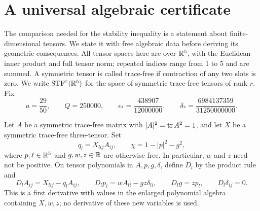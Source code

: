 \section{A universal algebraic certificate}\label{sec:certificate}\label{cert:section}

The comparison needed for the stability inequality is a statement about
finite-dimensional tensors. We state it with free algebraic data before
deriving its geometric consequences. All tensor spaces here are over $\mathbb R^5$,
with the Euclidean inner product and full tensor norm; repeated indices range
from $1$ to $5$ and are summed.  A symmetric tensor is called trace-free if
contraction of any two
slots is zero.  We write $\operatorname{STF}^r(\mathbb R^5)$ for the space of symmetric trace-free
tensors of rank $r$.  Fix
\begin{equation}\label{cert:constants}
 a=\frac{29}{50},\qquad Q=250000,\qquad
 \epsilon_* =\frac{438907}{12000000},\qquad
 \delta_* =\frac{6984137359}{31250000000}.
\end{equation}

Let $A$ be a symmetric trace-free matrix with $|A|^2=\operatorname{tr} A^2=1$, and let
$X$ be a symmetric trace-free three-tensor.  Set
\[
 q_l=X_{lij}A_{ij},\qquad \chi=1-|p|^2-g^2,
\]
where $p,\ell\in\mathbb R^5$ and $g,w,z\in\mathbb R$ are otherwise free.  In particular,
$w$ and $z$ need not be positive.  On tensor polynomials in $A,p,g,\delta$,
define $D_l$ by the product rule and
\begin{equation}\label{cert:D}
 D_l A_{ij}=X_{lij}-q_lA_{ij},\qquad
 D_l p_i=wA_{li}-gz\delta_{li},\qquad
 D_l g=zp_l,\qquad D_l\delta_{ij}=0.
\end{equation}
This is a first derivative with values in the enlarged polynomial algebra
containing $X,w,z$; no derivative of these new variables is used.

